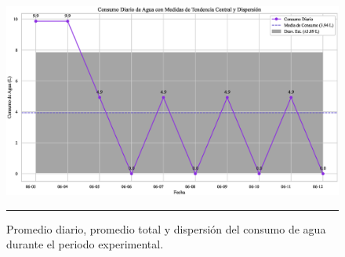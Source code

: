 \documentclass[pdflatex,sn-mathphys-num]{sn-jnl}%
\theoremstyle{thmstyleone}%
\theoremstyle{thmstyletwo}%
\theoremstyle{thmstylethree}%
\begin{document}
\begin{multicols}{2}
\justifying

\end{multicols}
\begin{figure}[H]
    \centering
    \includegraphics[width=1\textwidth]{assets/consumo_diario_promedio_y_estadisticas.eps}
    \caption{Promedio diario, promedio total y dispersión del consumo de agua durante el periodo experimental.}
    \label{fig:consumo_estadisticas}

    \vspace{0.4cm}

    \noindent
    \begin{minipage}[t]{0.45\textwidth}
        \justifying
	\end{minipage}%
    \hfill
    \begin{minipage}[t]{0.45\textwidth}
        \justifying

\end{minipage}

    \vspace{0.5cm}
    \hrule
\end{figure}
\newpage
\end{document}
